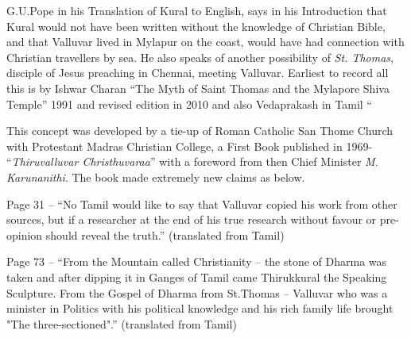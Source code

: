 G.U.Pope in his Translation of Kural to English, says in his Introduction that Kural would not have been written without the knowledge of Christian Bible, and that Valluvar lived in Mylapur on the coast, would have had connection with Christian travellers by sea. He also speaks of another possibility of \textit{St. Thomas}, disciple of Jesus preaching in Chennai, meeting Valluvar. Earliest to record all this is by Ishwar Charan “The Myth of Saint Thomas and the Mylapore Shiva Temple” 1991 and revised edition in 2010 and also Vedaprakash in Tamil “ 

This concept was developed by a tie-up of Roman Catholic San Thome Church with Protestant Madras Christian College, a First Book published in 1969- “\textit{Thiruvalluvar Christhuvaraa}” with a foreword from then Chief Minister \textit{M. Karunanithi}. The book made extremely new claims as below.

Page 31 -- “No Tamil would like to say that Valluvar copied his work from other sources, but if a researcher at the end of his true research without favour or pre-opinion should reveal the truth.” (translated from Tamil) 

Page 73 -- “From the Mountain called Christianity – the stone of Dharma was taken and after dipping it in Ganges of Tamil came Thirukkural the Speaking Sculpture. From the Gospel of Dharma from St.Thomas – Valluvar who was a minister in Politics with his political knowledge and his rich family life brought "The three-sectioned".” (translated from Tamil)

